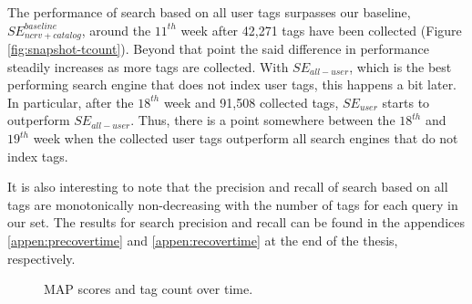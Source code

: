 The performance of search based on all user tags surpasses our baseline, $SE_{ncrv+catalog}^{baseline}$, around the $11^{th}$ week after 42,271 tags have been collected (Figure \ref{fig:snapshot-tcount}). Beyond that point the said difference in performance steadily increases as more tags are collected. With $SE_{all-user}$, which is the best performing search engine that does not index user tags, this happens a bit later. In particular, after the $18^{th}$ week and 91,508 collected tags, $SE_{user}$ starts to outperform $SE_{all-user}$. Thus, there is a point somewhere between the $18^{th}$ and $19^{th}$ week when the collected user tags outperform all search engines that do not index tags.

It is also interesting to note that the precision and recall of search based on all tags are monotonically non-decreasing with the number of tags for each query in our set. The results for search precision and recall can be found in the appendices \ref{appen:precovertime} and \ref{appen:recovertime} at the end of the thesis, respectively.

\begin{figure}
\caption{MAP scores and tag count over time.}
\end{figure}

